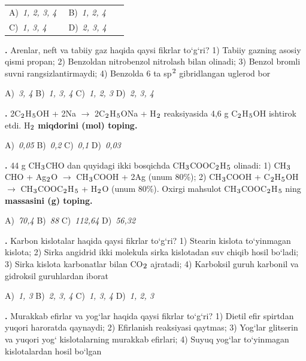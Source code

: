 \documentclass[11pt,a4paper]{article}
\renewcommand{\textsubscript}[1]{\ensuremath{_{\text{\fontsize{8}{8}\selectfont #1}}}}
\renewcommand{\textsuperscript}[1]{\ensuremath{^{\text{\fontsize{8}{8}\selectfont #1}}}}
\newcommand{\qn}[1]{\textbf{\fontsize{11.5}{13}\selectfont #1}}
\newcommand{\qsep}{\par\vspace{1pt}\noindent\rule{0pt}{0.4pt}\par\vspace{5pt}}
\begin{document}
\begin{multicols}{2}
\noindent\begin{tabular}{@{}p{0.47\linewidth}@{}p{0.47\linewidth}@{}}
A)~\textsl{1, 2, 3, 4} & B)~\textsl{1, 2, 4} \\
C)~\textsl{1, 3, 4} & D)~\textsl{2, 3, 4} \\
\end{tabular}\par
\qsep
\noindent\qn{22.} Arenlar, neft va tabiiy gaz haqida qaysi fikrlar to`g`ri? 1) Tabiiy gazning asosiy qismi propan; 2) Benzoldan nitrobenzol nitrolash bilan olinadi; 3) Benzol bromli suvni rangsizlantirmaydi; 4) Benzolda 6 ta sp\textsuperscript{2} gibridlangan uglerod bor

\noindent A)~\textsl{3, 4} \hfill B)~\textsl{1, 3, 4} \hfill C)~\textsl{1, 2, 3} \hfill D)~\textsl{2, 3, 4}\par
\qsep
\noindent\qn{23.} 2C\textsubscript{2}H\textsubscript{5}OH + 2Na $\to$ 2C\textsubscript{2}H\textsubscript{5}ONa + H\textsubscript{2} reaksiyasida 4,6 g C\textsubscript{2}H\textsubscript{5}OH ishtirok etdi. H\textsubscript{2} \textbf{miqdorini (mol) toping.}

\noindent A)~\textsl{0,05} \hfill B)~\textsl{0,2} \hfill C)~\textsl{0,1} \hfill D)~\textsl{0,03}\par
\qsep
\noindent\qn{24.} 44 g CH\textsubscript{3}CHO dan quyidagi ikki bosqichda CH\textsubscript{3}COOC\textsubscript{2}H\textsubscript{5} olinadi: 1) CH\textsubscript{3}CHO + Ag\textsubscript{2}O $\to$ CH\textsubscript{3}COOH + 2Ag (unum 80\%); 2) CH\textsubscript{3}COOH + C\textsubscript{2}H\textsubscript{5}OH $\to$ CH\textsubscript{3}COOC\textsubscript{2}H\textsubscript{5} + H\textsubscript{2}O (unum 80\%). Oxirgi mahsulot CH\textsubscript{3}COOC\textsubscript{2}H\textsubscript{5} ning \textbf{massasini (g) toping.}

\noindent A)~\textsl{70,4} \hfill B)~\textsl{88} \hfill C)~\textsl{112,64} \hfill D)~\textsl{56,32}\par
\qsep
\noindent\qn{25.} Karbon kislotalar haqida qaysi fikrlar to`g`ri? 1) Stearin kislota to`yinmagan kislota; 2) Sirka angidrid ikki molekula sirka kislotadan suv chiqib hosil bo`ladi; 3) Sirka kislota karbonatlar bilan CO\textsubscript{2} ajratadi; 4) Karboksil guruh karbonil va gidroksil guruhlardan iborat

\noindent A)~\textsl{1, 3} \hfill B)~\textsl{2, 3, 4} \hfill C)~\textsl{1, 3, 4} \hfill D)~\textsl{1, 2, 3}\par
\qsep
\noindent\qn{26.} Murakkab efirlar va yog`lar haqida qaysi fikrlar to`g`ri? 1) Dietil efir spirtdan yuqori haroratda qaynaydi; 2) Efirlanish reaksiyasi qaytmas; 3) Yog`lar glitserin va yuqori yog` kislotalarning murakkab efirlari; 4) Suyuq yog`lar to`yinmagan kislotalardan hosil bo`lgan


\end{multicols}
\end{document}
